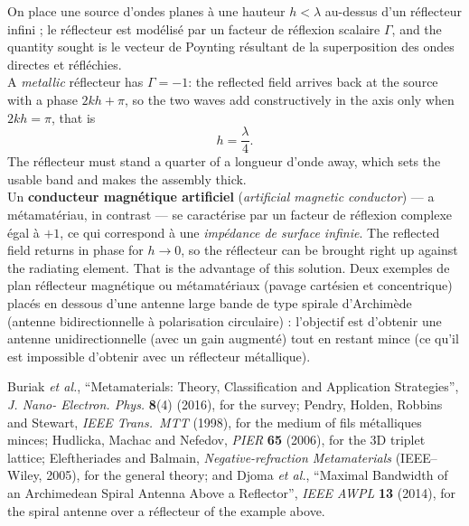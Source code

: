 \begin{example}
  On place une source d'ondes planes à une hauteur $h < \lambda$ au-dessus
  d'un réflecteur infini ; le réflecteur est modélisé par un facteur de
  réflexion scalaire $\Gamma$, and the quantity sought is le vecteur de
  Poynting résultant de la superposition des ondes directes et réfléchies.\\

  A \emph{metallic} réflecteur has $\Gamma = -1$: the reflected field arrives
  back at the source with a phase $2kh + \pi$, so the two waves add
  constructively in the axis only when $2kh = \pi$, that is
  \[ h = \frac{\lambda}{4}. \]
  The réflecteur must stand a quarter of a longueur d'onde away, which sets the
  usable band and makes the assembly thick.\\

  Un \textbf{conducteur magnétique artificiel} (\textit{artificial magnetic
  conductor}) --- a métamatériau, in contrast --- se caractérise par un
  facteur de réflexion complexe égal à $+1$, ce qui correspond à une
  \emph{impédance de surface infinie}. The reflected field returns in phase for
  $h \to 0$, so the réflecteur can be brought right up against the radiating
  element. That is the advantage of this solution. Deux exemples de plan
  réflecteur magnétique ou métamatériaux (pavage cartésien et concentrique)
  placés en dessous d'une antenne large bande de type spirale d'Archimède
  (antenne bidirectionnelle à polarisation circulaire) : l'objectif est
  d'obtenir une antenne unidirectionnelle (avec un gain augmenté) tout en
  restant mince (ce qu'il est impossible d'obtenir avec un réflecteur
  métallique).
\end{example}

\begin{remark}[References]
  Buriak \textit{et al.}, ``Metamaterials: Theory, Classification and
  Application Strategies'', \textit{J. Nano- Electron. Phys.} \textbf{8}(4)
  (2016), for the survey; Pendry, Holden, Robbins and Stewart, \textit{IEEE
  Trans.\ MTT} (1998), for the medium of fils métalliques minces; Hudlicka,
  Machac and Nefedov,
  \textit{PIER} \textbf{65} (2006), for the 3D triplet lattice; Eleftheriades
  and Balmain, \textit{Negative-refraction Metamaterials} (IEEE--Wiley, 2005),
  for the general theory; and Djoma \textit{et al.}, ``Maximal Bandwidth of an
  Archimedean Spiral Antenna Above a Reflector'', \textit{IEEE AWPL}
  \textbf{13} (2014), for the spiral antenne over a réflecteur of the example
  above.
\end{remark}
